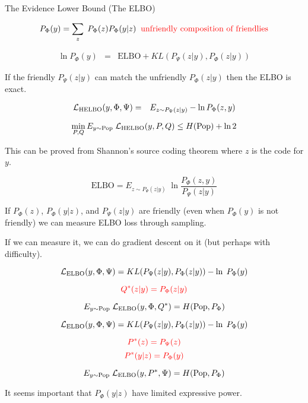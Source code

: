 {The Evidence Lower Bound (The ELBO)}

$$P_\Phi(y) = \sum_z\;P_\Phi(z)P_\Phi(y|z)\;\;\mbox{\color{red} unfriendly composition of friendlies}$$

\begin{eqnarray*}
\ln P_\Phi(y) & = & \mathrm{ELBO} + KL(P_\Psi(z|y),P_\Phi(z|y))
\end{eqnarray*}


\vfill
{\color{red} If the friendly $P_\Psi(z|y)$ can match the unfriendly $P_\Phi(z|y)$ then the ELBO is exact.}



\begin{eqnarray*}
{\cal L}_{\mathrm{HELBO}}(y,\Phi,\Psi) &  = &  E_{z \sim P_\Psi(z|y)} - \ln P_\Phi(z,y)
\end{eqnarray*}


\vfill
{\color{red} $$\min_{P,Q} E_{y \sim \mathrm{Pop}}\;{\cal L}_{\mathrm{HELBO}}(y,P,Q) \leq H(\mathrm{Pop}) + \ln 2$$}

\vfill
This can be proved from Shannon's source coding theorem where $z$ is the code for $y$.



$$\mathrm{ELBO}  =  E_{z \sim P_\Psi(z|y)}\; \ln \frac{P_\Phi(z,y)}{P_\Psi(z|y)}$$

\vfill
If $P_\Phi(z)$, $P_\Phi(y|z)$, and $P_\Psi(z|y)$ are friendly (even when $P_\Phi(y)$ is not friendly) we can
measure ELBO loss through sampling.

\vfill
If we can measure it, we can do gradient descent on it (but perhaps with difficulty).



$${\cal L}_{\mathrm{ELBO}}(y,\Phi,\Psi) = KL(P_\Psi(z|y),P_{\Phi}(z|y)) - \ln\;P_{\Phi}(y)$$

\vfill
$${\color{red} Q^*(z|y) = P_\Phi(z|y)}$$

\vfill
$$E_{y \sim \mathrm{Pop}}\;{\cal L}_{\mathrm{ELBO}}(y,\Phi,Q^*) = H(\mathrm{Pop},P_\Phi)$$


$${\cal L}_{\mathrm{ELBO}}(y,\Phi,\Psi) = KL(P_\Psi(z|y),P_{\Phi}(z|y)) - \ln\;P_{\Phi}(y)$$

$${\color{red} P^*(z) = P_\Psi(z)}$$
$${\color{red} P^*(y|z) = P_\Phi(y)}$$

$$E_{y \sim \mathrm{Pop}}\;{\cal L}_{\mathrm{ELBO}}(y,P^*,\Psi) = H(\mathrm{Pop},P_\Phi)$$

\vfill
It seems important that $P_\Phi(y|z)$ have limited expressive power.




